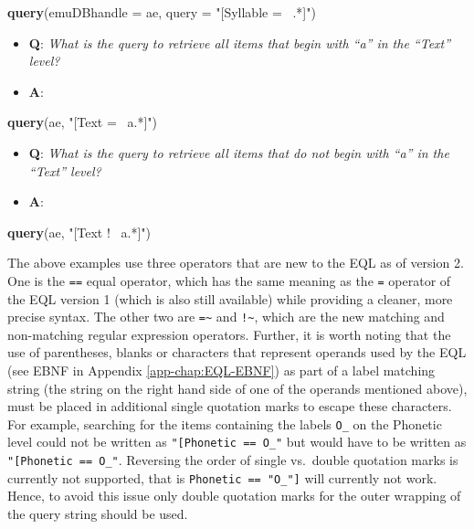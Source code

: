 \documentclass[]{book}
\newenvironment{Shaded}{\begin{snugshade}}{\end{snugshade}}
\newcommand{\DataTypeTok}[1]{\textcolor[rgb]{0.13,0.29,0.53}{#1}}
\newcommand{\KeywordTok}[1]{\textcolor[rgb]{0.13,0.29,0.53}{\textbf{#1}}}
\newcommand{\NormalTok}[1]{#1}
\newcommand{\StringTok}[1]{\textcolor[rgb]{0.31,0.60,0.02}{#1}}
\providecommand{\tightlist}{%
  \setlength{\itemsep}{0pt}\setlength{\parskip}{0pt}}
\begin{document}
\begin{Shaded}
\begin{Highlighting}[]
\KeywordTok{query}\NormalTok{(}\DataTypeTok{emuDBhandle =}\NormalTok{ ae, }
      \DataTypeTok{query =} \StringTok{"[Syllable =~ .*]"}\NormalTok{)}
\end{Highlighting}
\end{Shaded}

\begin{itemize}
\tightlist
\item
  \textbf{Q}: \emph{What is the query to retrieve all items that begin with ``a'' in the ``Text'' level?}
\item
  \textbf{A}:
\end{itemize}

\begin{Shaded}
\begin{Highlighting}[]
\KeywordTok{query}\NormalTok{(ae, }\StringTok{"[Text =~ a.*]"}\NormalTok{)}
\end{Highlighting}
\end{Shaded}

\begin{itemize}
\tightlist
\item
  \textbf{Q}: \emph{What is the query to retrieve all items that do not begin with ``a'' in the ``Text'' level?}
\item
  \textbf{A}:
\end{itemize}

\begin{Shaded}
\begin{Highlighting}[]
\KeywordTok{query}\NormalTok{(ae, }\StringTok{"[Text !~ a.*]"}\NormalTok{)}
\end{Highlighting}
\end{Shaded}

The above examples use three operators that are new to the EQL as of version 2. One is the \texttt{==} equal operator, which has the same meaning as the \texttt{=} operator of the EQL version 1 (which is also still available) while providing a cleaner, more precise syntax. The other two are \texttt{=\textasciitilde{}} and \texttt{!\textasciitilde{}}, which are the new matching and non-matching regular expression operators. Further, it is worth noting that the use of parentheses, blanks or characters that represent operands used by the EQL (see EBNF in Appendix \ref{app-chap:EQL-EBNF}) as part of a label matching string (the string on the right hand side of one of the operands mentioned above), must be placed in additional single quotation marks to escape these characters. For example, searching for the items containing the labels \texttt{O\_\textquotesingle{}} on the Phonetic level could not be written as \texttt{"{[}Phonetic\ ==\ O\_\textquotesingle{}{]}"} but would have to be written as \texttt{"{[}Phonetic\ ==\ \textquotesingle{}O\_\textquotesingle{}\textquotesingle{}{]}"}. Reversing the order of single vs.~double quotation marks is currently not supported, that is \texttt{\textquotesingle{}{[}Phonetic\ ==\ "O\_\textquotesingle{}"{]}\textquotesingle{}} will currently not work. Hence, to avoid this issue only double quotation marks for the outer wrapping of the query string should be used.
\end{document}
